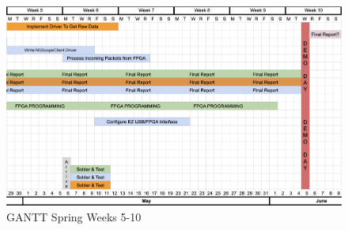 			\begin{figure}[H]
				\centering
				\includegraphics[width=0.8\linewidth]{images/GANTT4.png}
				\caption{GANTT Spring Weeks 5-10}
				\label{fig:ngscope-client}
				\vspace{15px}
			\end{figure}
			